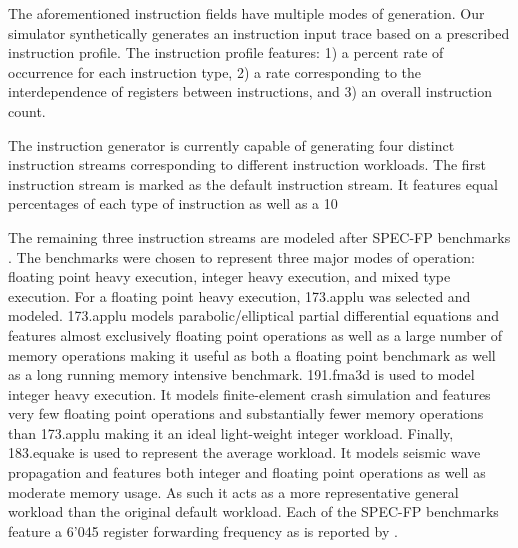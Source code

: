 \documentclass{acm_proc_article-sp}
\begin{document}
The aforementioned instruction fields have multiple modes of generation.  Our simulator synthetically generates an instruction input trace based on a prescribed instruction profile.  The instruction profile features: 1) a percent rate of occurrence for each instruction type, 2) a rate corresponding to the interdependence of registers between instructions, and 3) an overall instruction count.  

The instruction generator is currently capable of generating four distinct instruction streams corresponding to different instruction workloads.  The first instruction stream is marked as the default instruction stream.  It features equal percentages of each type of instruction as well as a 10%

The remaining three instruction streams are modeled after SPEC-FP benchmarks \cite{rupnow}.  The benchmarks were chosen to represent three major modes of operation:  floating point heavy execution, integer heavy execution, and mixed type execution.  For a floating point heavy execution, 173.applu was selected and modeled.  173.applu models parabolic/elliptical partial differential equations and features almost exclusively floating point operations as well as a large number of memory operations making it useful as both a floating point benchmark as well as a long running memory intensive benchmark.  191.fma3d is used to model integer heavy execution.  It models finite-element crash simulation and features very few floating point operations and substantially fewer memory operations than 173.applu making it an ideal light-weight integer workload.  Finally, 183.equake is used to represent the average workload.  It models seismic wave propagation and features both integer and floating point operations as well as moderate memory usage.  As such it acts as a more representative general workload than the original default workload.  Each of the SPEC-FP benchmarks feature a 6{\char'045} register forwarding frequency as is reported by \cite{kucuk}.
\end{document}
